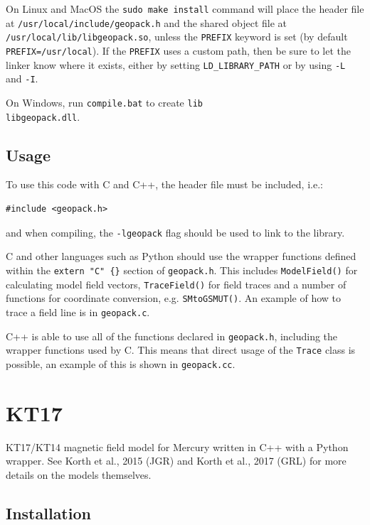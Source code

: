 			On Linux and MacOS the \texttt{sudo make install} command will place the header file at \texttt{/usr/local/include/geopack.h} and the shared object file at \texttt{/usr/local/lib/libgeopack.so}, unless the \texttt{PREFIX} keyword is set (by default \texttt{PREFIX=/usr/local}). If the \texttt{PREFIX} uses a custom path, then be sure to let the linker know where it exists, either by setting \texttt{LD\_LIBRARY\_PATH} or by using \texttt{-L} and \texttt{-I}.

			On Windows, run \texttt{compile.bat} to create \texttt{lib\\libgeopack.dll}.

		\subsection{Usage}
			
			To use this code with C and C++, the header file must be included, i.e.:
			\begin{verbatim}
#include <geopack.h>
			\end{verbatim}
			and when compiling, the \texttt{-lgeopack} flag should be used to link to the library. 

			C and other languages such as Python should use the wrapper functions defined within the \texttt{extern "C" \{\}} section of \texttt{geopack.h}. This includes \texttt{ModelField()} for calculating model field vectors, \texttt{TraceField()} for field traces and a number of functions for coordinate conversion, e.g. \texttt{SMtoGSMUT()}. An example of how to trace a field line is in \texttt{geopack\tests\test.c}.

			C++ is able to use all of the functions declared in \texttt{geopack.h}, including the wrapper functions used by C. This means that direct usage of the \texttt{Trace} class is possible, an example of this is shown in \texttt{geopack\tests\test.cc}.
			

			\section{KT17}

			KT17/KT14 magnetic field model for Mercury written in C++ with a Python wrapper. See Korth et al., 2015 (JGR) and Korth et al., 2017 (GRL) for more details on the models themselves.
			
			\subsection{Installation}
			
